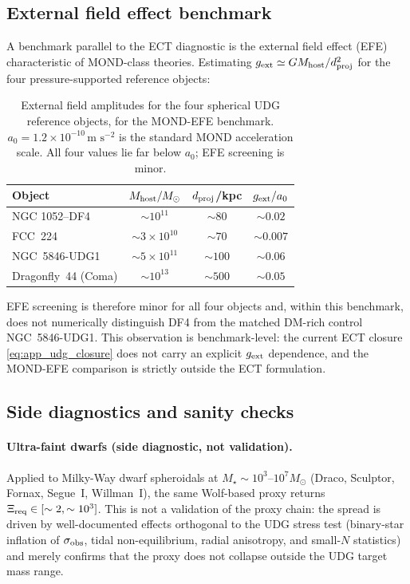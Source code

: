 \subsection{External field effect benchmark}
\label{app:udg:efe}

A benchmark parallel to the ECT diagnostic is the external field
effect (EFE) characteristic of MOND-class theories.  Estimating
$g_{\rm ext}\simeq GM_{\rm host}/d_{\rm proj}^2$ for the four
pressure-supported reference objects:

\begin{longtable}{@{}l c c c@{}}
\caption{External field amplitudes for the four spherical UDG
reference objects, for the MOND-EFE benchmark.  $a_0=1.2\times
10^{-10}\,\text{m s}^{-2}$ is the standard MOND acceleration
scale.  All four values lie far below $a_0$; EFE screening is
minor.}
\label{tab:udg_efe}\\
\toprule
Object & $M_{\rm host}/M_\odot$ & $d_{\rm proj}$/kpc & $g_{\rm ext}/a_0$\\
\midrule
\endfirsthead
\bottomrule
\endfoot
NGC 1052--DF4        & $\sim 10^{11}$   & $\sim 80$  & $\sim 0.02$\\
FCC~224              & $\sim 3\times 10^{10}$ & $\sim 70$  & $\sim 0.007$\\
NGC~5846-UDG1        & $\sim 5\times 10^{11}$ & $\sim 100$ & $\sim 0.06$\\
Dragonfly~44 (Coma)  & $\sim 10^{13}$   & $\sim 500$ & $\sim 0.05$\\
\end{longtable}

EFE screening is therefore minor for all four objects and, within
this benchmark, does not numerically distinguish DF4 from the
matched DM-rich control NGC~5846-UDG1.  This observation is
benchmark-level: the current ECT closure
\eqref{eq:app_udg_closure} does not carry an explicit
$g_{\rm ext}$ dependence, and the MOND-EFE comparison is strictly
outside the ECT formulation.

\subsection{Side diagnostics and sanity checks}
\label{app:udg:side_checks}

\paragraph{Ultra-faint dwarfs (side diagnostic, not validation).}
Applied to Milky-Way dwarf spheroidals at
$M_\star\sim 10^3$--$10^7 M_\odot$ (Draco, Sculptor, Fornax,
Segue~I, Willman~I), the same Wolf-based proxy returns
$\Xi_{\rm req}\in[\sim 2,\sim 10^3]$.  This is not a validation of
the proxy chain: the spread is driven by well-documented effects
orthogonal to the UDG stress test (binary-star inflation of
$\sigma_{\rm obs}$, tidal non-equilibrium, radial anisotropy, and
small-$N$ statistics) and merely confirms that the proxy does not
collapse outside the UDG target mass range.

